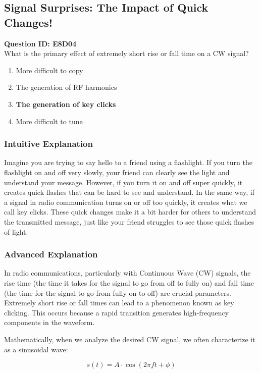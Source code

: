 \subsection{Signal Surprises: The Impact of Quick Changes!}
\begin{tcolorbox}
\textbf{Question ID: E8D04} \\
What is the primary effect of extremely short rise or fall time on a CW signal? 
\begin{enumerate}[label=\Alph*.]
    \item More difficult to copy
    \item The generation of RF harmonics
    \item \textbf{The generation of key clicks}
    \item More difficult to tune
\end{enumerate}
\end{tcolorbox}

\subsubsection{Intuitive Explanation}
Imagine you are trying to say hello to a friend using a flashlight. If you turn the flashlight on and off very slowly, your friend can clearly see the light and understand your message. However, if you turn it on and off super quickly, it creates quick flashes that can be hard to see and understand. In the same way, if a signal in radio communication turns on or off too quickly, it creates what we call key clicks. These quick changes make it a bit harder for others to understand the transmitted message, just like your friend struggles to see those quick flashes of light.

\subsubsection{Advanced Explanation}
In radio communications, particularly with Continuous Wave (CW) signals, the rise time (the time it takes for the signal to go from off to fully on) and fall time (the time for the signal to go from fully on to off) are crucial parameters. Extremely short rise or fall times can lead to a phenomenon known as key clicking. This occurs because a rapid transition generates high-frequency components in the waveform.

Mathematically, when we analyze the desired CW signal, we often characterize it as a sinusoidal wave:

\[
s(t) = A \cdot \cos(2\pi f t + \phi)
\]

